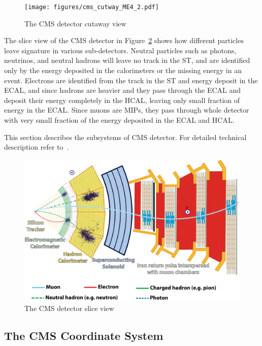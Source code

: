 \begin{figure}[!ht]
  \centering
  \texttt{[image: figures/cms\_cutway\_ME4\_2.pdf]}
  \caption[The CMS detector cutaway view]%
  {The CMS detector cutaway view~\cite{image-cms-cutway}}%
  \label{fig:cms-cutaway}
\end{figure}

The slice view of the \gls{CMS} detector in Figure~\ref{fig:cms-slice}
shows how different particles leave signature in various sub-detectors.
Neutral particles such as photons, neutrinos, and neutral hadrons will leave no track
in the \gls{ST}, and are identified only by the energy deposited
in the calorimeters or the missing energy in an event.
Electrons are identified from the track in the \gls{ST} and energy deposit
in the \gls{ECAL}, and since hadrons are heavier and they pass through the \gls{ECAL}
and deposit their energy completely in the \gls{HCAL}, leaving only small fraction
of energy in the \gls{ECAL}.
Since muons are \glspl{MIP}, they pass through whole detector with very small
fraction of the energy deposited in the \gls{ECAL} and \gls{HCAL}.

This section describes the subsystems of \gls{CMS} detector.
For detailed technical description refer to~\cite{CMS-JINST-S08004}.

\begin{figure}[!ht]
  \centering
  \includegraphics[width=\textwidth]{figures/cms_slice.png}
  \caption[The CMS detector slice view]%
  {The CMS detector slice view~\cite{image-cms-slice}}%
  \label{fig:cms-slice}
\end{figure}

\clearpage{}
\subsection{
  The CMS Coordinate System
}\label{ch_cms:cms-coordinate}

